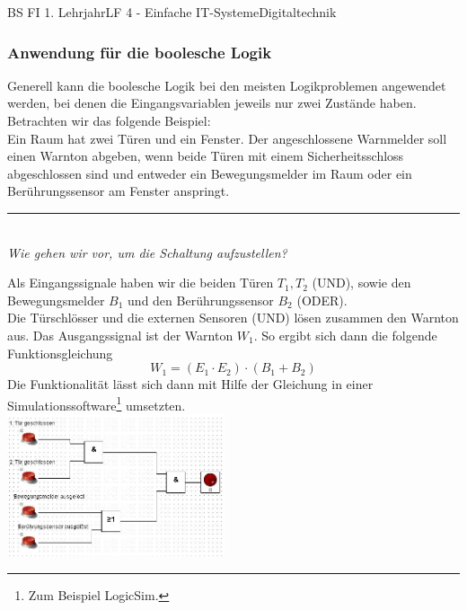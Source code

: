 \documentclass[11pt,twocolumn,oneside,openany,headings=optiontotoc,11pt,numbers=noenddot]{article}
\begin{document}
\begin{worksheet}{BS FI 1. Lehrjahr}{LF 4 - Einfache IT-Systeme}{Digitaltechnik}
		\subsubsection{Anwendung für die boolesche Logik}
		Generell kann die boolesche Logik bei den meisten Logikproblemen angewendet werden, bei denen die Eingangsvariablen jeweils nur zwei Zustände haben.\\
		Betrachten wir das folgende Beispiel:\\
		Ein Raum hat zwei Türen und ein Fenster. Der angeschlossene Warnmelder soll einen Warnton abgeben, wenn beide Türen mit einem Sicherheitsschloss abgeschlossen sind und entweder ein Bewegungsmelder im Raum oder ein Berührungssensor am Fenster anspringt.\\
		\rule{0.48\textwidth}{0.1pt}\\
		\textit{Wie gehen wir vor, um die Schaltung aufzustellen?}\\
		\par\noindent
		Als Eingangssignale haben wir die beiden Türen \(T_1, T_2\) (UND), sowie den Bewegungsmelder \(B_1\) und den Berührungssensor \(B_2\) (ODER).\\
		Die Türschlösser und die externen Sensoren (UND) lösen zusammen den Warnton aus. Das Ausgangssignal ist der Warnton \(W_1\). So ergibt sich dann die folgende Funktionsgleichung \[W_1 = (E_1\cdot{}E_2)\cdot{}(B_1 + B_2)\]
		Die Funktionalität lässt sich dann mit Hilfe der Gleichung in einer Simulationssoftware\footnote{Zum Beispiel LogicSim.} umsetzten.\\
		\includegraphics[width=0.48\textwidth]{../99_Bilder/SkrAlarmanlage.jpg}\\
	\end{worksheet}
\end{document}
